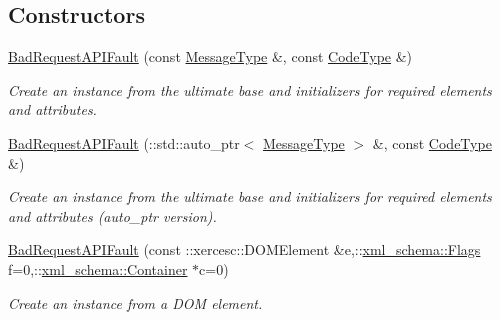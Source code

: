 \subsection*{Constructors}
\begin{DoxyCompactItemize}
\item 
\hypertarget{classopenstack_1_1xml_1_1BadRequestAPIFault_a6cc8422c16b2365adb4b060272fa7d2d}{
\hyperlink{classopenstack_1_1xml_1_1BadRequestAPIFault_a6cc8422c16b2365adb4b060272fa7d2d}{BadRequestAPIFault} (const \hyperlink{classopenstack_1_1xml_1_1CloudServersAPIFault_aff7b9d2067747fa033a0ea4408011af6}{MessageType} \&, const \hyperlink{classopenstack_1_1xml_1_1CloudServersAPIFault_aa9f350c9dba08ae375b2a61568551550}{CodeType} \&)}
\label{classopenstack_1_1xml_1_1BadRequestAPIFault_a6cc8422c16b2365adb4b060272fa7d2d}

\begin{DoxyCompactList}\small\item\em Create an instance from the ultimate base and initializers for required elements and attributes. \item\end{DoxyCompactList}\item 
\hyperlink{classopenstack_1_1xml_1_1BadRequestAPIFault_aeb63f1e0229dd6da262ab0f7714bb240}{BadRequestAPIFault} (::std::auto\_\-ptr$<$ \hyperlink{classopenstack_1_1xml_1_1CloudServersAPIFault_aff7b9d2067747fa033a0ea4408011af6}{MessageType} $>$ \&, const \hyperlink{classopenstack_1_1xml_1_1CloudServersAPIFault_aa9f350c9dba08ae375b2a61568551550}{CodeType} \&)
\begin{DoxyCompactList}\small\item\em Create an instance from the ultimate base and initializers for required elements and attributes (auto\_\-ptr version). \item\end{DoxyCompactList}\item 
\hyperlink{classopenstack_1_1xml_1_1BadRequestAPIFault_a85fce2e32164159b60cd21c5ab137cc1}{BadRequestAPIFault} (const ::xercesc::DOMElement \&e,::\hyperlink{namespacexml__schema_affb4c227cbd9aa7453dd1dc5a1401943}{xml\_\-schema::Flags} f=0,::\hyperlink{namespacexml__schema_a333dea2213742aea47a37532dec4ec27}{xml\_\-schema::Container} $\ast$c=0)
\begin{DoxyCompactList}\small\item\em Create an instance from a DOM element. \item\end{DoxyCompactList}\item 

\end{DoxyCompactItemize}
